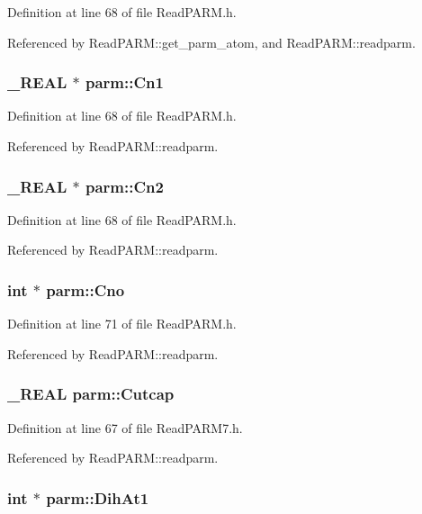 Definition at line 68 of file Read\-PARM.h.

Referenced by Read\-PARM::get\_\-parm\_\-atom, and Read\-PARM::readparm.
\subsubsection{\setlength{\rightskip}{0pt plus 5cm}\_\-REAL $\ast$ parm::Cn1}\label{structparm_m46}




Definition at line 68 of file Read\-PARM.h.

Referenced by Read\-PARM::readparm.
\subsubsection{\setlength{\rightskip}{0pt plus 5cm}\_\-REAL $\ast$ parm::Cn2}\label{structparm_m47}




Definition at line 68 of file Read\-PARM.h.

Referenced by Read\-PARM::readparm.
\subsubsection{\setlength{\rightskip}{0pt plus 5cm}int $\ast$ parm::Cno}\label{structparm_m57}




Definition at line 71 of file Read\-PARM.h.

Referenced by Read\-PARM::readparm.
\subsubsection{\setlength{\rightskip}{0pt plus 5cm}\_\-REAL parm::Cutcap}\label{structparm_m51}




Definition at line 67 of file Read\-PARM7.h.

Referenced by Read\-PARM::readparm.
\subsubsection{\setlength{\rightskip}{0pt plus 5cm}int $\ast$ parm::Dih\-At1}\label{structparm_m81}




